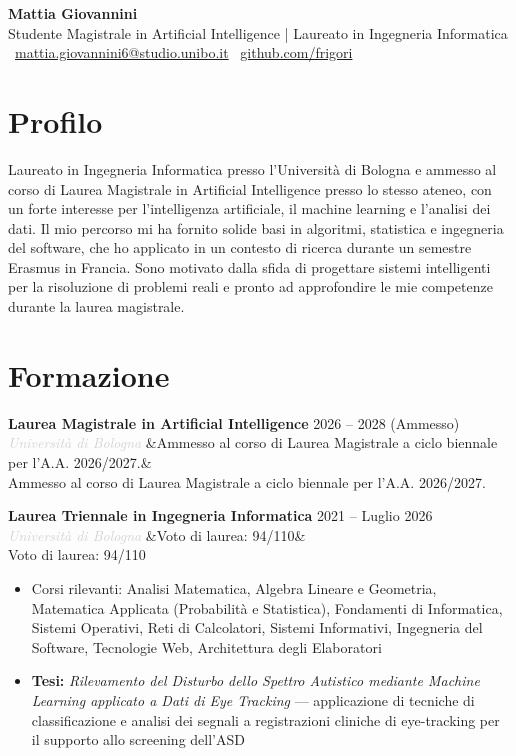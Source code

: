 \documentclass[a4paper,10pt]{article}
\newcommand{\entry}[4]{%
  \noindent\textbf{#1} \hfill \textcolor{accent}{#2}\\
  \textit{\textcolor{lightgray}{#3}}%
  \ifx&#4&\else\\\vspace{0.2em}#4\fi
  \vspace{0.5em}
}
\newcommand{\entrylist}[5]{%
  \noindent\textbf{#1} \hfill \textcolor{accent}{#2}\\
  \textit{\textcolor{lightgray}{#3}}%
  \ifx&#4&\else\\\vspace{0.2em}#4\fi
  \vspace{0.3em}
  \begin{itemize}#5\end{itemize}
  \vspace{0.3em}
}
\begin{document}
\begin{center}
  {\Huge\bfseries\color{darkgray} Mattia Giovannini}\\[0.4em]
  {\large\color{accent} Studente Magistrale in Artificial Intelligence | Laureato in Ingegneria Informatica}\\[0.7em]
  \textcolor{lightgray}{
    \faEnvelope\ \href{mailto:mattia.giovannini6@studio.unibo.it}{mattia.giovannini6@studio.unibo.it}
    \quad\textbullet\quad
    \faGithub\ \href{https://github.com/frigori}{github.com/frigori}
  }
\end{center}

\vspace{0.5em}

\section{Profilo}

Laureato in Ingegneria Informatica presso l’Università di Bologna e ammesso al corso di Laurea Magistrale in Artificial Intelligence presso lo stesso ateneo, con un forte interesse per l’intelligenza artificiale, il machine learning e l’analisi dei dati. Il mio percorso mi ha fornito solide basi in algoritmi, statistica e ingegneria del software, che ho applicato in un contesto di ricerca durante un semestre Erasmus in Francia. Sono motivato dalla sfida di progettare sistemi intelligenti per la risoluzione di problemi reali e pronto ad approfondire le mie competenze durante la laurea magistrale.

\section{Formazione}

\entry{Laurea Magistrale in Artificial Intelligence}{2026 -- 2028 (Ammesso)}{Università di Bologna}
{Ammesso al corso di Laurea Magistrale a ciclo biennale per l'A.A. 2026/2027.}

\entrylist{Laurea Triennale in Ingegneria Informatica}{2021 -- Luglio 2026}{Università di Bologna}{Voto di laurea: 94/110}{
  \item Corsi rilevanti: Analisi Matematica, Algebra Lineare e Geometria,
        Matematica Applicata (Probabilità e Statistica), Fondamenti di Informatica,
        Sistemi Operativi, Reti di Calcolatori, Sistemi Informativi,
        Ingegneria del Software, Tecnologie Web, Architettura degli Elaboratori
  \item \textbf{Tesi:} \textit{Rilevamento del Disturbo dello Spettro Autistico mediante Machine Learning applicato a Dati di Eye Tracking} — applicazione di tecniche di classificazione e analisi dei segnali a registrazioni cliniche di eye-tracking per il supporto allo screening dell’ASD
}
\end{document}
